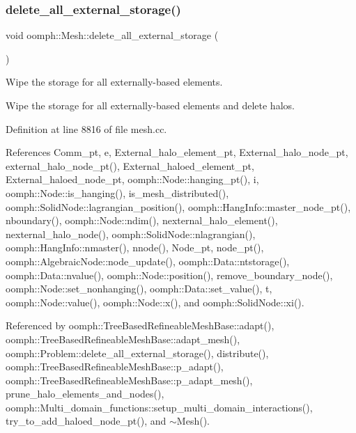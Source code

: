 \subsubsection{\texorpdfstring{delete\+\_\+all\+\_\+external\+\_\+storage()}{delete\_all\_external\_storage()}}
{\footnotesize\ttfamily void oomph\+::\+Mesh\+::delete\+\_\+all\+\_\+external\+\_\+storage (\begin{DoxyParamCaption}{ }\end{DoxyParamCaption})}



Wipe the storage for all externally-\/based elements. 

Wipe the storage for all externally-\/based elements and delete halos. 

Definition at line 8816 of file mesh.\+cc.



References Comm\+\_\+pt, e, External\+\_\+halo\+\_\+element\+\_\+pt, External\+\_\+halo\+\_\+node\+\_\+pt, external\+\_\+halo\+\_\+node\+\_\+pt(), External\+\_\+haloed\+\_\+element\+\_\+pt, External\+\_\+haloed\+\_\+node\+\_\+pt, oomph\+::\+Node\+::hanging\+\_\+pt(), i, oomph\+::\+Node\+::is\+\_\+hanging(), is\+\_\+mesh\+\_\+distributed(), oomph\+::\+Solid\+Node\+::lagrangian\+\_\+position(), oomph\+::\+Hang\+Info\+::master\+\_\+node\+\_\+pt(), nboundary(), oomph\+::\+Node\+::ndim(), nexternal\+\_\+halo\+\_\+element(), nexternal\+\_\+halo\+\_\+node(), oomph\+::\+Solid\+Node\+::nlagrangian(), oomph\+::\+Hang\+Info\+::nmaster(), nnode(), Node\+\_\+pt, node\+\_\+pt(), oomph\+::\+Algebraic\+Node\+::node\+\_\+update(), oomph\+::\+Data\+::ntstorage(), oomph\+::\+Data\+::nvalue(), oomph\+::\+Node\+::position(), remove\+\_\+boundary\+\_\+node(), oomph\+::\+Node\+::set\+\_\+nonhanging(), oomph\+::\+Data\+::set\+\_\+value(), t, oomph\+::\+Node\+::value(), oomph\+::\+Node\+::x(), and oomph\+::\+Solid\+Node\+::xi().



Referenced by oomph\+::\+Tree\+Based\+Refineable\+Mesh\+Base\+::adapt(), oomph\+::\+Tree\+Based\+Refineable\+Mesh\+Base\+::adapt\+\_\+mesh(), oomph\+::\+Problem\+::delete\+\_\+all\+\_\+external\+\_\+storage(), distribute(), oomph\+::\+Tree\+Based\+Refineable\+Mesh\+Base\+::p\+\_\+adapt(), oomph\+::\+Tree\+Based\+Refineable\+Mesh\+Base\+::p\+\_\+adapt\+\_\+mesh(), prune\+\_\+halo\+\_\+elements\+\_\+and\+\_\+nodes(), oomph\+::\+Multi\+\_\+domain\+\_\+functions\+::setup\+\_\+multi\+\_\+domain\+\_\+interactions(), try\+\_\+to\+\_\+add\+\_\+haloed\+\_\+node\+\_\+pt(), and $\sim$\+Mesh().

